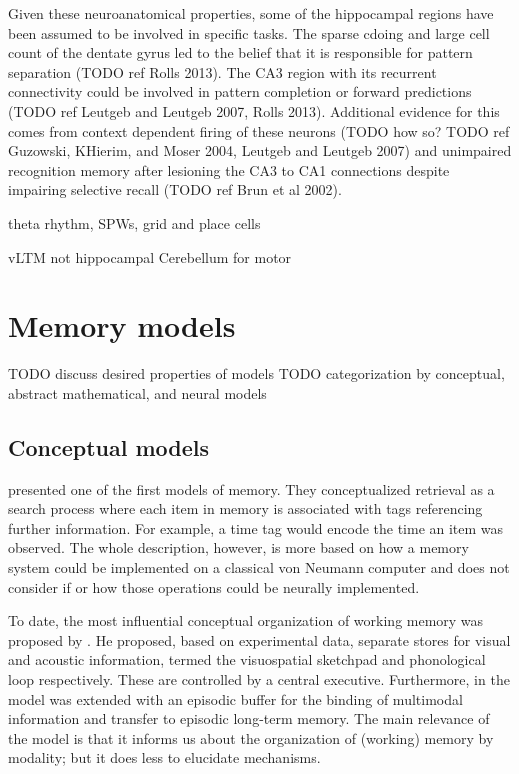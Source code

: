 Given these neuroanatomical properties, some of the hippocampal regions have been assumed to be involved in specific tasks.
The sparse cdoing and large cell count of the dentate gyrus led to the belief that it is responsible for pattern separation (TODO ref Rolls 2013).
The CA3 region with its recurrent connectivity could be involved in pattern completion or forward predictions (TODO ref Leutgeb and Leutgeb 2007, Rolls 2013).
Additional evidence for this comes from context dependent firing of these neurons (TODO how so? TODO ref Guzowski, KHierim, and Moser 2004, Leutgeb and Leutgeb 2007) and unimpaired recognition memory after lesioning the CA3 to CA1 connections despite impairing selective recall (TODO ref Brun et al 2002). 

theta rhythm, SPWs, grid and place cells

vLTM not hippocampal
Cerebellum for motor


\section{Memory models}
TODO discuss desired properties of models
TODO categorization by conceptual, abstract mathematical, and neural models

\subsection{Conceptual models}
\Textcite{Yntema1963} presented one of the first models of memory.
They conceptualized retrieval as a search process where each item in memory is associated with tags referencing further information.
For example, a time tag would encode the time an item was observed.
The whole description, however, is more based on how a memory system could be implemented on a classical von Neumann computer and does not consider if or how those operations could be neurally implemented.

To date, the most influential conceptual organization of working memory was proposed by \textcite{Baddeley1986}.
He proposed, based on experimental data, separate stores for visual and acoustic information, termed the visuospatial sketchpad and phonological loop respectively.
These are controlled by a central executive.
Furthermore, in \textcite{Baddeley2000} the model was extended with an episodic buffer for the binding of multimodal information and transfer to episodic long-term memory.
The main relevance of the model is that it informs us about the organization of (working) memory by modality; but it does less to elucidate mechanisms.

